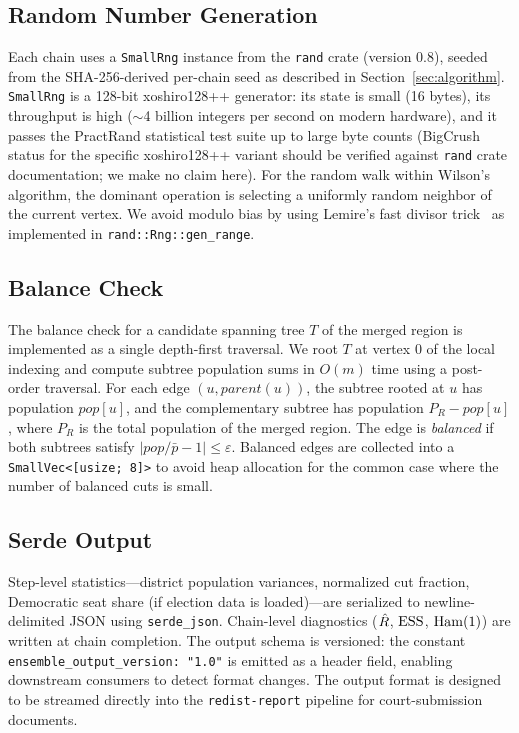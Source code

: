 \subsection{Random Number Generation}
\label{ssec:rng}

Each chain uses a \texttt{SmallRng} instance from the \texttt{rand} crate
(version 0.8), seeded from the SHA-256-derived per-chain seed as described
in Section~\ref{sec:algorithm}.
\texttt{SmallRng} is a 128-bit xoshiro128++ generator: its state is small
(16 bytes), its throughput is high ($\sim$4 billion integers per second
on modern hardware), and it passes the PractRand statistical test suite
up to large byte counts (BigCrush status for the specific xoshiro128++
variant should be verified against \texttt{rand} crate documentation;
we make no claim here).
For the random walk within Wilson's algorithm, the dominant operation is
selecting a uniformly random neighbor of the current vertex.
We avoid modulo bias by using Lemire's fast divisor trick~\citep{lemire2019fast}
as implemented in \texttt{rand::Rng::gen\_range}.

\subsection{Balance Check}

The balance check for a candidate spanning tree $T$ of the merged region
is implemented as a single depth-first traversal.
We root $T$ at vertex 0 of the local indexing and compute subtree
population sums in $O(m)$ time using a post-order traversal.
For each edge $(u, \mathit{parent}(u))$, the subtree rooted at $u$ has
population $\mathit{pop}[u]$, and the complementary subtree has
population $P_R - \mathit{pop}[u]$, where $P_R$ is the total population
of the merged region.
The edge is \emph{balanced} if both subtrees satisfy
$|\mathit{pop}/\bar{p} - 1| \leq \varepsilon$.
Balanced edges are collected into a \texttt{SmallVec<[usize; 8]>} to
avoid heap allocation for the common case where the number of balanced
cuts is small.

\subsection{Serde Output}

Step-level statistics---district population variances, normalized cut
fraction, Democratic seat share (if election data is loaded)---are
serialized to newline-delimited JSON using \texttt{serde\_json}.
Chain-level diagnostics ($\hat{R}$, $\mathrm{ESS}$, $\mathrm{Ham}(1)$) are written at
chain completion.
The output schema is versioned: the constant
\texttt{ensemble\_output\_version: "1.0"} is emitted as a header field,
enabling downstream consumers to detect format changes.
The output format is designed to be streamed directly into the
\texttt{redist-report} pipeline for court-submission documents.

